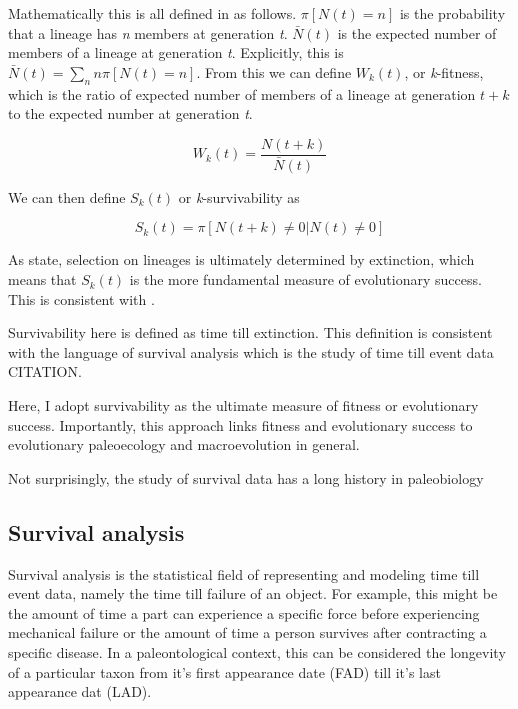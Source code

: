 \documentclass[12pt,letterpaper]{article}
\begin{document}
Mathematically this is all defined in \citet{Palmer2012} as follows. \(\pi[N(t) = n]\) is the probability that a lineage has \textit{n} members at generation \textit{t}. \(\bar{N}(t)\) is the expected number of members of a lineage at generation \textit{t}. Explicitly, this is \(\bar{N}(t) = \sum_{n} n \pi[N(t) = n]\). From this we can define \(W_{k}(t)\), or \textit{k}-fitness, which is the ratio of expected number of members of a lineage at generation \(t + k\) to the expected number at generation \textit{t}.

\begin{equation}
  W_{k}(t) = \frac{N (t + k)}{\bar{N} (t)}
  \label{eq:kfit}
\end{equation}

We can then define \(S_{k}(t)\) or \textit{k}-survivability as

\begin{equation}
  S_{k}(t) = \pi[N(t + k) \neq 0 | N(t) \neq 0]
  \label{eq:ksuv}
\end{equation}

As \citet{Palmer2012} state, selection on lineages is ultimately determined by extinction, which means that \(S_{k}(t)\) is the more fundamental measure of evolutionary success. This is consistent with \citep{Cooper1984}. 

Survivability here is defined as time till extinction. This definition is consistent with the language of survival analysis which is the study of time till event data CITATION.

Here, I adopt survivability as the ultimate measure of fitness or evolutionary success. Importantly, this approach links fitness and evolutionary success to evolutionary paleoecology and macroevolution in general.



Not surprisingly, the study of survival data has a long history in paleobiology


\subsection{Survival analysis}
Survival analysis is the statistical field of representing and modeling time till event data, namely the time till failure of an object. For example, this might be the amount of time a part can experience a specific force before experiencing mechanical failure or the amount of time a person survives after contracting a specific disease. In a paleontological context, this can be considered the longevity of a particular taxon from it's first appearance date (FAD) till it's last appearance dat (LAD).
\end{document}

